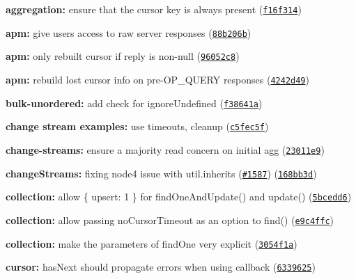 \begin{DoxyItemize}
\item {\bfseries aggregation\+:} ensure that the {\ttfamily cursor} key is always present (\href{https://github.com/mongodb/node-mongodb-native/commit/f16f314}{\tt f16f314})
\item {\bfseries apm\+:} give users access to raw server responses (\href{https://github.com/mongodb/node-mongodb-native/commit/88b206b}{\tt 88b206b})
\item {\bfseries apm\+:} only rebuilt cursor if reply is non-\/null (\href{https://github.com/mongodb/node-mongodb-native/commit/96052c8}{\tt 96052c8})
\item {\bfseries apm\+:} rebuild lost {\ttfamily cursor} info on pre-\/\+O\+P\+\_\+\+Q\+U\+E\+RY responses (\href{https://github.com/mongodb/node-mongodb-native/commit/4242d49}{\tt 4242d49})
\item {\bfseries bulk-\/unordered\+:} add check for ignore\+Undefined (\href{https://github.com/mongodb/node-mongodb-native/commit/f38641a}{\tt f38641a})
\item {\bfseries change stream examples\+:} use timeouts, cleanup (\href{https://github.com/mongodb/node-mongodb-native/commit/c5fec5f}{\tt c5fec5f})
\item {\bfseries change-\/streams\+:} ensure a majority read concern on initial agg (\href{https://github.com/mongodb/node-mongodb-native/commit/23011e9}{\tt 23011e9})
\item {\bfseries change\+Streams\+:} fixing node4 issue with util.\+inherits (\href{https://github.com/mongodb/node-mongodb-native/issues/1587}{\tt \#1587}) (\href{https://github.com/mongodb/node-mongodb-native/commit/168bb3d}{\tt 168bb3d})
\item {\bfseries collection\+:} allow \{ upsert\+: 1 \} for find\+One\+And\+Update() and update() (\href{https://github.com/mongodb/node-mongodb-native/commit/5bcedd6}{\tt 5bcedd6})
\item {\bfseries collection\+:} allow passing {\ttfamily no\+Cursor\+Timeout} as an option to {\ttfamily find()} (\href{https://github.com/mongodb/node-mongodb-native/commit/e9c4ffc}{\tt e9c4ffc})
\item {\bfseries collection\+:} make the parameters of find\+One very explicit (\href{https://github.com/mongodb/node-mongodb-native/commit/3054f1a}{\tt 3054f1a})
\item {\bfseries cursor\+:} {\ttfamily has\+Next} should propagate errors when using callback (\href{https://github.com/mongodb/node-mongodb-native/commit/6339625}{\tt 6339625})

\end{DoxyItemize}
